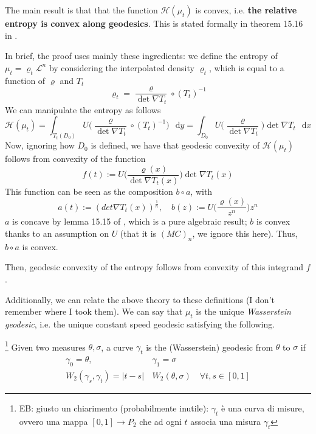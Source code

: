 \documentclass[a4paper,12pt,reqno]{amsbook}
\theoremstyle{definition} %
\newcommand*\de{\mathop{}\!\mathrm{d}}
\newcommand{\1}{\mathbbm{1}}
\newcommand{\mL}{\mathscr{L}}
\newcommand{\cH}{\mathcal{H}} %
\theoremstyle{plain}
\theoremstyle{remark}
\begin{document}
{The main result is that that the function $\cH(\mu_t)$ is convex, i.e. \textbf{the relative entropy is convex along geodesics}. This is stated formally in theorem 15.16 in \cite{brue}. 

In brief, the proof uses mainly these ingredients: we define the entropy of $\mu_t = \varrho_t \mL^n$ by considering the interpolated density $\varrho_t$, which is equal to a function of $\varrho$ and $T_t$
\[
\varrho_t = \frac{\varrho}{\det \nabla T_t}\circ (T_t)^{-1}
\] 
We can manipulate the entropy as follows
\[
\cH(\mu_t)=\int_{T_t(D_0)} U\bigg(\frac{\varrho}{\det \nabla T_t}\circ (T_t)^{-1}\bigg) \, \de{y} = \int_{D_0} U\bigg(\frac{\varrho}{\det \nabla T_t}\bigg) \det \nabla T_t \, \de{x}  
\]
Now, ignoring how $D_0$ is defined, we have that geodesic convexity of $\cH(\mu_t)$ follows from convexity of the function
\[
f(t):= U \bigg(\frac{\varrho(x)}{\det \nabla T_t(x)}\bigg) \det \nabla T_t (x)
\]
This function can be seen as the composition $b\circ a$, with
\begin{equation}\label{eq: detstrano}
    a(t) := (det \nabla T_t(x))^{\frac{1}{n}}, \quad b(z) := U\Big(\frac{\varrho(x)}{z^n}\Big)z^n
\end{equation}
$a$ is concave by lemma 15.15 of \cite{brue}, which is a pure algebraic result; $b$ is convex thanks to an assumption on $U$ (that it is $(MC)_n$, we ignore this here).  Thus, $b\circ a$ is convex.

Then, geodesic convexity of the entropy follows from convexity of this integrand $f$. 

Additionally, we can relate the above theory to these definitions  (I don't remember where I took them).
We can say that $\mu_t$ is the unique \textit{Wasserstein geodesic}, i.e. the unique constant speed geodesic satisfying the following.
\begin{definition}[$W$ geodesic]\label{def: Wgeodesic}
\footnote{EB: giusto un chiarimento (probabilmente inutile): $\gamma_t$ è una curva di misure, ovvero una mappa $[0,1] \to P_2$ che ad ogni $t$ associa una misura $\gamma_t$}    Given two measures $\theta,\sigma$, a curve $\gamma_t$ is the (Wasserstein) geodesic from $\theta$ to $\sigma$ if
    \begin{align*}
        \gamma_0=\theta,\,\,& \gamma_1=\sigma\\
        W_2 (\gamma_s, \gamma_t) = |t-s|\, &W_2( \theta, \sigma) \quad \forall t,s \in [0,1]
    \end{align*}
\end{definition}

}
\end{document}
